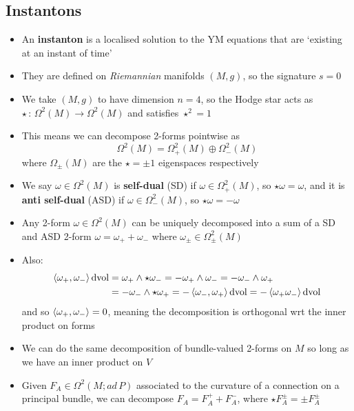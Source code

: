 \documentclass[12pt,a4paper]{article}
\numberwithin{equation}{section}
\begin{document}
	\subsection{Instantons}
	\begin{itemize}
		\item An \textbf{instanton} is a localised solution to the YM equations that are `existing at an instant of time'
		\item They are defined on \emph{Riemannian} manifolds $(M,g)$, so the signature $s=0$
		\item We take $(M,g)$ to have dimension $n=4$, so the Hodge star acts as $\star\,:\,\Omega^{2}(M)\to\Omega^{2}(M)$ and satisfies $\star^{2}=1$
		\item This means we can decompose 2-forms pointwise as
		\begin{equation}
			\Omega^{2}(M)=\Omega^{2}_{+}(M)\oplus\Omega_{-}^{2}(M)
		\end{equation}
		where $\Omega_{\pm}(M)$ are the $\star=\pm 1$ eigenspaces respectively
		\item We say $\omega\in\Omega^{2}(M)$ is \textbf{self-dual} (SD) if $\omega\in\Omega_{+}^{2}(M)$, so $\star\omega=\omega$, and it is \textbf{anti self-dual} (ASD) if $\omega\in\Omega_{-}^{2}(M)$, so $\star\omega=-\omega$
		\item Any 2-form $\omega\in\Omega^{2}(M)$ can be uniquely decomposed into a sum of a SD and ASD 2-form $\omega=\omega_{+}+\omega_{-}$ where $\omega_{\pm}\in\Omega^{2}_{\pm}(M)$
		\item Also:
		\begin{equation}
			\begin{aligned}
				\braket{\omega_{+},\omega_{-}}\text{dvol}&=\omega_{+}\wedge\star\omega_{-}=-\omega_{+}\wedge\omega_{-}=-\omega_{-}\wedge\omega_{+}\\&=-\omega_{-}\wedge\star\omega_{+}=-\braket{\omega_{-},\omega_{+}}\text{dvol}=-\braket{\omega_{+}\omega_{-}}\text{dvol}
			\end{aligned}
		\end{equation}
		and so $\braket{\omega_{+},\omega_{-}}=0$, meaning the decomposition is orthogonal wrt the inner product on forms
		\item We can do the same decomposition of bundle-valued 2-forms on $M$ so long as we have an inner product on $V$
		\item Given $F_{A}\in\Omega^{2}(M;ad\,P)$ associated to the curvature of a connection on a principal bundle, we can decompose $F_{A}=F_{A}^{+}+F_{A}^{-}$, where $\star F_{A}^{\pm}=\pm F_{A}^{\pm}$

\end{itemize}
\end{document}

